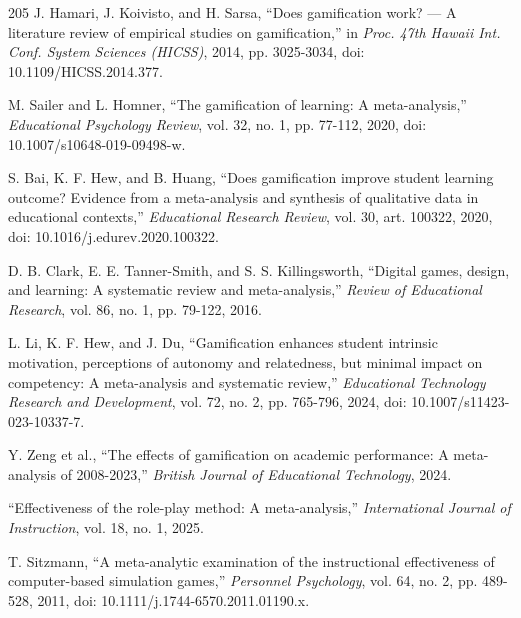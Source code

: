 \begin{thebibliography}{205}
 J. Hamari, J. Koivisto, and H. Sarsa, ``Does gamification work? --- A literature review of empirical studies on gamification,'' in \textit{Proc. 47th Hawaii Int. Conf. System Sciences (HICSS)}, 2014, pp. 3025-3034, doi: 10.\allowbreak{}1109/\allowbreak{}HICSS.\allowbreak{}2014.\allowbreak{}377.

 M. Sailer and L. Homner, ``The gamification of learning: A meta-\allowbreak{}analysis,'' \textit{Educational Psychology Review}, vol. 32, no. 1, pp. 77-112, 2020, doi: 10.\allowbreak{}1007/\allowbreak{}s10648-\allowbreak{}019-\allowbreak{}09498-\allowbreak{}w.

 S. Bai, K. F. Hew, and B. Huang, ``Does gamification improve student learning outcome? Evidence from a meta-\allowbreak{}analysis and synthesis of qualitative data in educational contexts,'' \textit{Educational Research Review}, vol. 30, art. 100322, 2020, doi: 10.\allowbreak{}1016/\allowbreak{}j.\allowbreak{}edurev.\allowbreak{}2020.\allowbreak{}100322.

 D. B. Clark, E. E. Tanner-\allowbreak{}Smith, and S. S. Killingsworth, ``Digital games, design, and learning: A systematic review and meta-\allowbreak{}analysis,'' \textit{Review of Educational Research}, vol. 86, no. 1, pp. 79-122, 2016.

 L. Li, K. F. Hew, and J. Du, ``Gamification enhances student intrinsic motivation, perceptions of autonomy and relatedness, but minimal impact on competency: A meta-\allowbreak{}analysis and systematic review,'' \textit{Educational Technology Research and Development}, vol. 72, no. 2, pp. 765-796, 2024, doi: 10.\allowbreak{}1007/\allowbreak{}s11423-\allowbreak{}023-\allowbreak{}10337-\allowbreak{}7.

 Y. Zeng et al., ``The effects of gamification on academic performance: A meta-\allowbreak{}analysis of 2008-2023,'' \textit{British Journal of Educational Technology}, 2024.

 ``Effectiveness of the role-play method: A meta-\allowbreak{}analysis,'' \textit{International Journal of Instruction}, vol. 18, no. 1, 2025.

 T. Sitzmann, ``A meta-\allowbreak{}analytic examination of the instructional effectiveness of computer-\allowbreak{}based simulation games,'' \textit{Personnel Psychology}, vol. 64, no. 2, pp. 489-528, 2011, doi: 10.\allowbreak{}1111/\allowbreak{}j.\allowbreak{}1744-\allowbreak{}6570.\allowbreak{}2011.\allowbreak{}01190.\allowbreak{}x.


\end{thebibliography}
